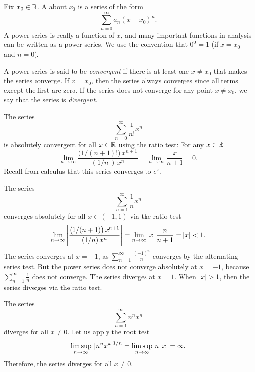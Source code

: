 Fix $x_0 \in {\mathbb{R}}$.
A \emph{} about $x_0$
is a series of the form
\begin{equation*}
\sum_{n=0}^\infty a_n {(x-x_0)}^n .
\end{equation*}
A power series is really a function of $x$, and
many important functions in analysis can be written
as a power series.  We use the convention that
$0^0 = 1$ (if $x=x_0$ and $n=0$).

A power series is said to be
\emph{convergent} if
there is at least one $x \not= x_0$ that makes the series converge.
If $x=x_0$, then the series always
converges since all terms except the first are zero.
If the series does not converge for any point $x \not= x_0$, we say that
the series is \emph{divergent}.

\begin{example} \label{ps:expex}
The series
\begin{equation*}
\sum_{n=0}^\infty \frac{1}{n!} x^n
\end{equation*}
is absolutely convergent for all $x \in {\mathbb{R}}$ using the ratio test:
For any $x \in {\mathbb{R}}$
\begin{equation*}
\lim_{n \to \infty}
\frac{\bigl(1/(n+1)!\bigr) \, x^{n+1}}{(1/n!) \, x^{n}}
=
\lim_{n \to \infty}
\frac{x}{n+1}
=
0.
\end{equation*}
Recall from calculus that this series converges to $e^x$.
\end{example}

\begin{example} \label{ps:1kex}
The series
\begin{equation*}
\sum_{n=1}^\infty \frac{1}{n} x^n
\end{equation*}
converges absolutely for all $x \in (-1,1)$ via the ratio test:
\begin{equation*}
\lim_{n \to \infty}
\left\lvert {
\frac{\bigl(1/(n+1) \bigr) \, x^{n+1}}{(1/n) \, x^{n}}
} \right\rvert
=
\lim_{n \to \infty}
\left\lvert {x} \right\rvert \frac{n}{n+1}
=
\left\lvert {x} \right\rvert < 1 .
\end{equation*}
The series converges at $x=-1$,
as
$\sum_{n=1}^\infty \frac{{(-1)}^n}{n}$ converges
by the alternating series
test.
But the power series does not converge absolutely at $x=-1$, because
$\sum_{n=1}^\infty \frac{1}{n}$ does not converge.
The series
diverges at $x=1$.
When $\left\lvert {x} \right\rvert > 1$, then the series diverges via the ratio test.
\end{example}

\begin{example} \label{ps:divergeex}
The series
\begin{equation*}
\sum_{n=1}^\infty n^n x^n
\end{equation*}
diverges for all $x \not= 0$.  Let us apply the root test
\begin{equation*}
\limsup_{n\to\infty}
\,
\left\lvert {n^n x^n} \right\rvert^{1/n}
=
\limsup_{n\to\infty}
\,
n \left\lvert {x} \right\rvert
= \infty .
\end{equation*}
Therefore, the series diverges for all $x \not= 0$.
\end{example}

